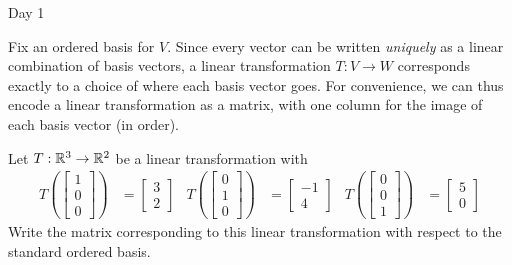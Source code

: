\documentclass{article}[12pt]
\begin{document}
\begin{applicationActivities}{Day 1}
\begin{observation}
Fix an ordered basis for $V$.  Since every vector can be written \textit{uniquely} as a linear combination of basis vectors, a linear transformation $T:V \rightarrow W$ corresponds exactly to a choice of where each basis vector goes.  For convenience, we can thus encode a linear transformation as a matrix, with one column for the image of each basis vector (in order).
\end{observation}

\begin{activity}
Let $T: \mathbb{R}^3 \rightarrow \mathbb{R}^2$ be a linear transformation with
\begin{align*}
T\left(\begin{bmatrix} 1 \\ 0 \\ 0 \end{bmatrix} \right) &= \begin{bmatrix} 3 \\ 2\end{bmatrix} &
T\left(\begin{bmatrix} 0 \\ 1 \\ 0 \end{bmatrix} \right) &= \begin{bmatrix} -1 \\ 4\end{bmatrix} &
T\left(\begin{bmatrix} 0 \\ 0 \\ 1 \end{bmatrix} \right) &= \begin{bmatrix} 5 \\ 0\end{bmatrix}
\end{align*}
Write the matrix corresponding to this linear transformation with respect to the standard ordered basis.
\end{activity}


\end{applicationActivities}
\end{document}
